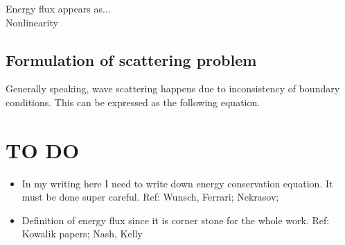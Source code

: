 Energy flux appears as...\\
Nonlinearity\\

\subsection{Formulation of scattering problem}
Generally speaking, wave scattering happens due to inconsistency of boundary conditions. This can be expressed as the following equation.

\newpage
\section{TO DO}
\begin{itemize}
\item In my writing here I need to write down energy conservation equation. It must be done super careful. Ref: Wunsch, Ferrari; Nekrasov; 
\item Definition of energy flux since it is corner stone for the whole work. Ref: Kowalik papers; Nash, Kelly

\end{itemize}




